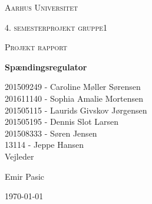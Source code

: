 \thispagestyle{empty}
	{\centering
	{\scshape\LARGE Aarhus Universitet \par}
	\vspace{1cm}
	{\scshape\Large 4. semesterprojekt gruppe1\par}
	{\scshape\Large Projekt rapport\par}
	\vspace{1.5cm}
	{\huge\bfseries Spændingsregulator\par}
	\vspace{2cm}
	{\Large
	201509249 - Caroline Møller Sørensen\\
	201611140 - Sophia Amalie Mortensen\\
	201505115 - Laurids Givskov Jørgensen\\
	201505195 - Dennis Slot Larsen \\
	201508333 - Søren Jensen\\
	13114 - Jeppe Hansen\\   }
	\vfill
	Vejleder\par
	Emir Pasic

	\vfill

	{\large \today\par}
\par}

